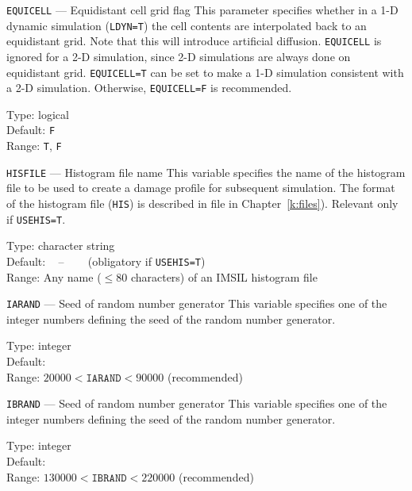 \begin{keydescription}{\texttt{EQUICELL} --- Equidistant cell grid flag}
%
  This parameter specifies whether in a 1-D dynamic simulation (\texttt{LDYN=T}) 
  the cell contents are interpolated back to an equidistant grid.  Note that
  this will introduce artificial diffusion.  \texttt{EQUICELL} is ignored
  for a 2-D simulation, since 2-D simulations are always done on equidistant
  grid. \texttt{EQUICELL=T} can be set to make a 1-D simulation
  consistent with a 2-D simulation. Otherwise, \texttt{EQUICELL=F} is 
  recommended.
  \begin{keytab}
    Type:    \> logical \\
    Default: \> \texttt{F} \\
    Range:   \> \texttt{T}, \texttt{F} 
  \end{keytab}
\end{keydescription}

\begin{keydescription}{\texttt{HISFILE} --- Histogram file name}
%
  This variable specifies the name of the histogram file to be used to create
  a damage profile for subsequent simulation. The format of the histogram file
  (\texttt{HIS}) is described in file in Chapter~\ref{k:files}). Relevant only
  if \texttt{USEHIS=T}.
%
  \begin{keytab}
    Type:    \> character string \\
    Default: \> ~ -- ~~~ (obligatory if \texttt{USEHIS=T}) \\
    Range:   \> Any name ($\le 80$ characters) of an IMSIL histogram file 
  \end{keytab}
\end{keydescription}

\begin{keydescription}{\texttt{IARAND} --- Seed of random number generator}
%
  This variable specifies one of the integer numbers defining the seed of
  the random number generator.
%
  \begin{keytab}
    Type:    \> integer \\
    Default:  \\
    Range:   \> $20000 < \texttt{IARAND} < 90000$ (recommended)
  \end{keytab}
\end{keydescription}

\begin{keydescription}{\texttt{IBRAND} --- Seed of random number generator}
%
  This variable specifies one of the integer numbers defining the seed of
  the random number generator.
%
  \begin{keytab}
    Type:    \> integer \\
    Default:  \\
    Range:   \> $130000 < \texttt{IBRAND} < 220000$ (recommended)
  \end{keytab}
\end{keydescription}

